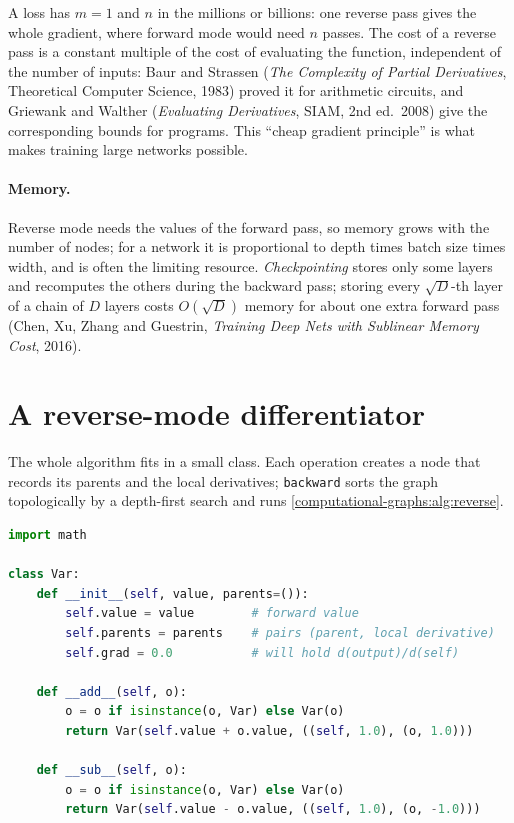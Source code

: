 \begin{notechapter}
A loss has $m = 1$ and $n$ in the millions or billions: one reverse pass gives the whole gradient,
where forward mode would need $n$ passes. The cost of a reverse pass is a constant multiple of
the cost of evaluating the function, independent of the number of inputs: Baur and Strassen
(\emph{The Complexity of Partial Derivatives}, Theoretical Computer Science, 1983) proved it
for arithmetic circuits, and Griewank and Walther (\emph{Evaluating Derivatives}, SIAM,
2nd ed.\ 2008) give the corresponding bounds for programs. This ``cheap gradient
principle'' is what makes training large networks possible.

\paragraph{Memory.} Reverse mode needs the values of the forward pass, so memory grows
with the number of nodes; for a network it is proportional to depth times batch size times
width, and is often the limiting resource. \emph{Checkpointing} stores only some layers and
recomputes the others during the backward pass; storing every $\sqrt D$-th layer of a chain of $D$
layers costs $O(\sqrt D)$ memory for about one extra forward pass (Chen, Xu, Zhang and Guestrin,
\emph{Training Deep Nets with Sublinear Memory Cost}, 2016).

\section{A reverse-mode differentiator}\label{computational-graphs:sec:code}

The whole algorithm fits in a small class. Each operation creates a node that records its
parents and the local derivatives; \texttt{backward} sorts the graph topologically by a
depth-first search and runs \cref{computational-graphs:alg:reverse}.

\begin{lstlisting}[language=Python]
import math

class Var:
    def __init__(self, value, parents=()):
        self.value = value        # forward value
        self.parents = parents    # pairs (parent, local derivative)
        self.grad = 0.0           # will hold d(output)/d(self)

    def __add__(self, o):
        o = o if isinstance(o, Var) else Var(o)
        return Var(self.value + o.value, ((self, 1.0), (o, 1.0)))

    def __sub__(self, o):
        o = o if isinstance(o, Var) else Var(o)
        return Var(self.value - o.value, ((self, 1.0), (o, -1.0)))


\end{lstlisting}
\end{notechapter}
